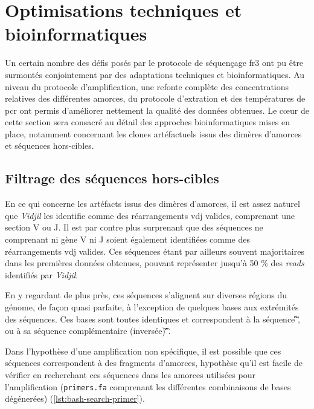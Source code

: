 \section{Optimisations techniques et bioinformatiques}

Un certain nombre des défis posés par le protocole de séquençage \gls{fr}3 ont pu être surmontés conjointement par 
des adaptations techniques et bioinformatiques. Au niveau du protocole d'amplification, une refonte complète des concentrations 
relatives des différentes amorces, du protocole d'extration et des températures de \gls{pcr} ont permis d'améliorer nettement 
la qualité des données obtenues. Le cœur de cette section sera consacré au détail des approches bioinformatiques mises en place, 
notamment concernant les clones artéfactuels issus des dimères d'amorces et séquences hors-cibles.

\subsection{Filtrage des séquences hors-cibles}

En ce qui concerne les artéfacts issus des dimères d'amorces, il est assez naturel que \textit{Vidjil} les identifie comme 
des réarrangements \gls{vdj} valides, comprenant une section V ou J. Il est par contre plus surprenant que des séquences ne comprenant 
ni gène V ni J soient également identifiées comme des réarrangements \gls{vdj} valides. Ces séquences étant par ailleurs souvent majoritaires 
dans les premières données obtenues, pouvant représenter jusqu'à 50 \% des \textit{reads} identifiés par \textit{Vidjil}.

\vspace{1em}

En y regardant de plus près, ces séquences s'alignent sur diverses régions du génome, de façon quasi parfaite, 
à l'exception de quelques bases aux extrémités des séquences. Ces bases sont toutes identiques et correspondent à la séquence 
\C\G\T\C\T\C\C\T\C\A\G\G\T\A\A\G, ou à sa séquence complémentaire (inversée) \C\T\T\A\C\C\T\G\A\G\G\A\G\A\C\G.

\vspace{1em}

Dans l'hypothèse d'une amplification non spécifique, il est possible que ces séquences correspondent à des fragments d'amorces,
hypothèse qu'il est facile de vérifier en recherchant ces séquences dans les amorces utilisées pour l'amplification (\texttt{primers.fa} 
comprenant les différentes combinaisons de bases dégénerées)
(\autoref{lst:bash-search-primer}).

